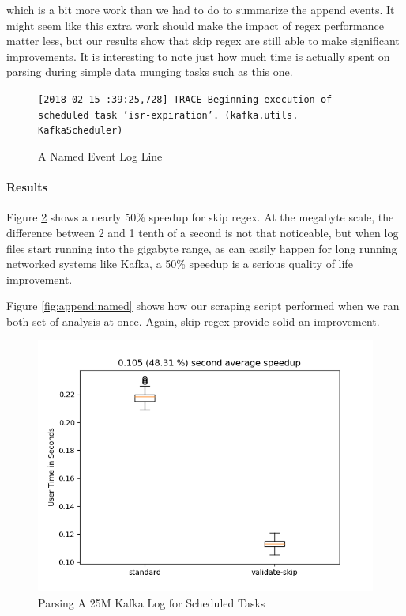 \noindent
which is a bit more work than we had to do to summarize the append
events. It might seem like this extra work should make the impact
of regex performance matter less, but our results show that
skip regex are still able to make significant improvements.
It is interesting to note just how much time is actually spent
on parsing during simple data munging tasks such as this one.

\begin{figure}
\caption{A Named Event Log Line}
\label{fig:namedevent}

\texttt{[2018-02-15 :39:25,728] \allowbreak TRACE \allowbreak
Beginning execution \allowbreak of scheduled \allowbreak
task 'isr-expiration'\allowbreak . \allowbreak(kafka.utils.\allowbreak
KafkaScheduler)
}
\end{figure}


\paragraph{Results}

Figure \ref{fig:named} shows a nearly 50\% speedup for skip regex.
At the megabyte scale, the difference between 2 and 1 tenth of
a second is not that noticeable, but when log files start running
into the gigabyte range, as can easily happen for long running
networked systems like Kafka, a 50\% speedup is a serious quality
of life improvement.

Figure \ref{fig:append:named} shows how our scraping script
performed when we ran both set of analysis at once. Again,
skip regex provide solid an improvement.

\begin{figure}
\caption{Parsing A 25M Kafka Log for Scheduled Tasks}
\label{fig:named}

\includegraphics{resources/named.png}
\end{figure}

